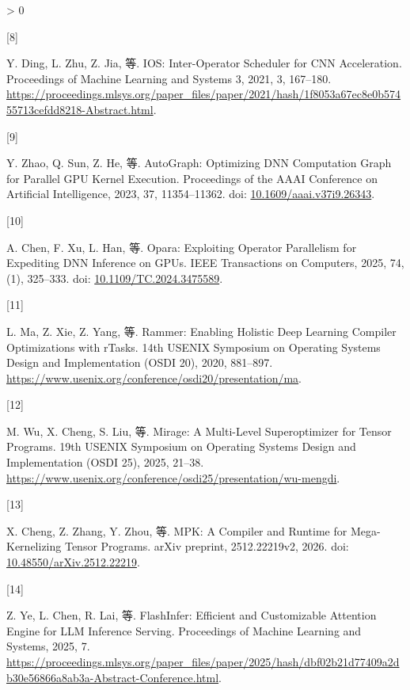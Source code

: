 \documentclass[
  UTF8,
  zihao=5]{ctexart}
\newlength{\cslhangindent}
\newlength{\csllabelwidth}
\newenvironment{CSLReferences}[2] %
 {%
  \setlength{\parindent}{0pt}
  \ifodd #1 \everypar{\setlength{\hangindent}{\cslhangindent}}\ignorespaces\fi
  \ifnum #2 > 0
  \setlength{\parskip}{#2\baselineskip}
  \fi
 }%
 {}
\newcommand{\CSLLeftMargin}[1]{\parbox[t]{\csllabelwidth}{#1}}
\newcommand{\CSLRightInline}[1]{\parbox[t]{\linewidth - \csllabelwidth}{#1}\par}
\begin{document}
\begin{CSLReferences}{0}{0}
\leavevmode{}%
\CSLLeftMargin{{[}8{]} }%
\CSLRightInline{Y. Ding, L. Zhu, Z. Jia, 等. IOS: Inter-Operator
Scheduler for CNN Acceleration. Proceedings of Machine Learning and
Systems 3, 2021, 3, 167--180.
\url{https://proceedings.mlsys.org/paper_files/paper/2021/hash/1f8053a67ec8e0b57455713cefdd8218-Abstract.html}.}

\leavevmode{}%
\CSLLeftMargin{{[}9{]} }%
\CSLRightInline{Y. Zhao, Q. Sun, Z. He, 等. AutoGraph: Optimizing DNN
Computation Graph for Parallel GPU Kernel Execution. Proceedings of the
AAAI Conference on Artificial Intelligence, 2023, 37, 11354--11362. doi:
\href{https://doi.org/10.1609/aaai.v37i9.26343}{10.1609/aaai.v37i9.26343}.}

\leavevmode{}%
\CSLLeftMargin{{[}10{]} }%
\CSLRightInline{A. Chen, F. Xu, L. Han, 等. Opara: Exploiting Operator
Parallelism for Expediting DNN Inference on GPUs. IEEE Transactions on
Computers, 2025, 74, (1), 325--333. doi:
\href{https://doi.org/10.1109/TC.2024.3475589}{10.1109/TC.2024.3475589}.}

\leavevmode{}%
\CSLLeftMargin{{[}11{]} }%
\CSLRightInline{L. Ma, Z. Xie, Z. Yang, 等. Rammer: Enabling Holistic
Deep Learning Compiler Optimizations with rTasks. 14th USENIX Symposium
on Operating Systems Design and Implementation (OSDI 20), 2020,
881--897.
\url{https://www.usenix.org/conference/osdi20/presentation/ma}.}

\leavevmode{}%
\CSLLeftMargin{{[}12{]} }%
\CSLRightInline{M. Wu, X. Cheng, S. Liu, 等. Mirage: A Multi-Level
Superoptimizer for Tensor Programs. 19th USENIX Symposium on Operating
Systems Design and Implementation (OSDI 25), 2025, 21--38.
\url{https://www.usenix.org/conference/osdi25/presentation/wu-mengdi}.}

\leavevmode{}%
\CSLLeftMargin{{[}13{]} }%
\CSLRightInline{X. Cheng, Z. Zhang, Y. Zhou, 等. MPK: A Compiler and
Runtime for Mega-Kernelizing Tensor Programs. arXiv preprint,
2512.22219v2, 2026. doi:
\href{https://doi.org/10.48550/arXiv.2512.22219}{10.48550/arXiv.2512.22219}.}

\leavevmode{}%
\CSLLeftMargin{{[}14{]} }%
\CSLRightInline{Z. Ye, L. Chen, R. Lai, 等. {FlashInfer: Efficient and
Customizable Attention Engine for LLM Inference Serving}. Proceedings of
Machine Learning and Systems, 2025, 7.
\url{https://proceedings.mlsys.org/paper_files/paper/2025/hash/dbf02b21d77409a2db30e56866a8ab3a-Abstract-Conference.html}.}


\end{CSLReferences}
\end{document}
